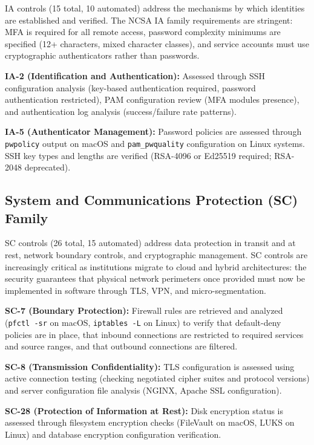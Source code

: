 \documentclass[12pt,oneside]{report}
\begin{document}
IA controls (15 total, 10 automated) address the mechanisms by which identities are established and verified. The NCSA IA family requirements are stringent: MFA is required for all remote access, password complexity minimums are specified (12+ characters, mixed character classes), and service accounts must use cryptographic authenticators rather than passwords.

\textbf{IA-2 (Identification and Authentication):} Assessed through SSH configuration analysis (key-based authentication required, password authentication restricted), PAM configuration review (MFA modules presence), and authentication log analysis (success/failure rate patterns).

\textbf{IA-5 (Authenticator Management):} Password policies are assessed through \texttt{pwpolicy} output on macOS and \texttt{pam\_pwquality} configuration on Linux systems. SSH key types and lengths are verified (RSA-4096 or Ed25519 required; RSA-2048 deprecated).

\subsection{System and Communications Protection (SC) Family}

SC controls (26 total, 15 automated) address data protection in transit and at rest, network boundary controls, and cryptographic management. SC controls are increasingly critical as institutions migrate to cloud and hybrid architectures: the security guarantees that physical network perimeters once provided must now be implemented in software through TLS, VPN, and micro-segmentation.

\textbf{SC-7 (Boundary Protection):} Firewall rules are retrieved and analyzed (\texttt{pfctl -sr} on macOS, \texttt{iptables -L} on Linux) to verify that default-deny policies are in place, that inbound connections are restricted to required services and source ranges, and that outbound connections are filtered.

\textbf{SC-8 (Transmission Confidentiality):} TLS configuration is assessed using active connection testing (checking negotiated cipher suites and protocol versions) and server configuration file analysis (NGINX, Apache SSL configuration).

\textbf{SC-28 (Protection of Information at Rest):} Disk encryption status is assessed through filesystem encryption checks (FileVault on macOS, LUKS on Linux) and database encryption configuration verification.
\end{document}

